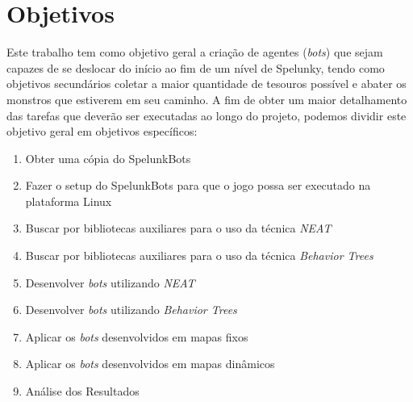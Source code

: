 \chapter{\label{chap:objectives}Objetivos}

Este trabalho tem como objetivo geral a criação de agentes (\textit{bots}) que
sejam capazes de se deslocar do início ao fim de um nível de Spelunky, tendo
como objetivos secundários coletar a maior quantidade de tesouros possível e
abater os monstros que estiverem em seu caminho. A fim de obter um maior
detalhamento das tarefas que deverão ser executadas ao longo do projeto,
podemos dividir este objetivo geral em objetivos específicos:

\begin{enumerate}
    \item
        Obter uma cópia do SpelunkBots
    \item
        Fazer o setup do SpelunkBots para que o jogo possa ser executado na
        plataforma Linux
    \item
        Buscar por bibliotecas auxiliares para o uso da técnica \textit{NEAT}
    \item
        Buscar por bibliotecas auxiliares para o uso da técnica
        \textit{Behavior Trees}
    \item
        Desenvolver \textit{bots} utilizando \textit{NEAT}
    \item
        Desenvolver \textit{bots} utilizando \textit{Behavior Trees}
    \item
        Aplicar os \textit{bots} desenvolvidos em mapas fixos
    \item
        Aplicar os \textit{bots} desenvolvidos em mapas dinâmicos
    \item
        Análise dos Resultados
\end{enumerate}
